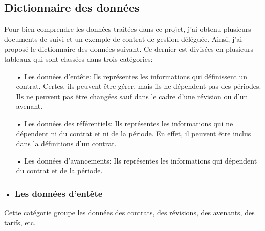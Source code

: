 	\subsection{Dictionnaire des données}
	Pour bien comprendre les données traitées dans ce projet, j'ai obtenu plusieurs documents de suivi et un exemple de contrat de gestion déléguée. Ainsi, j'ai proposé le dictionnaire des données suivant. Ce dernier est divisées en plusieurs tableaux qui sont classées dans trois catégories:
	\begin{itemize}
		\item[•] Les données d'entête: Ils représentes les informations qui définissent un contrat. Certes, ils peuvent être gérer, mais ils ne dépendent pas des périodes. Ils ne peuvent pas être changées sauf dans le cadre d'une révision ou d'un avenant.
		\item[•] Les données des référentiels: Ils représentes les informations qui ne dépendent ni du contrat et ni de la période. En effet, il peuvent être inclus dans la définitions d'un contrat.
		\item[•] Les données d'avancements: Ils représentes les informations qui dépendent du contrat et de la période.
	\end{itemize}

	\subsubsection{• Les données d'entête}

	Cette catégorie groupe les données des contrats, des révisions, des avenants, des tarifs, etc.

